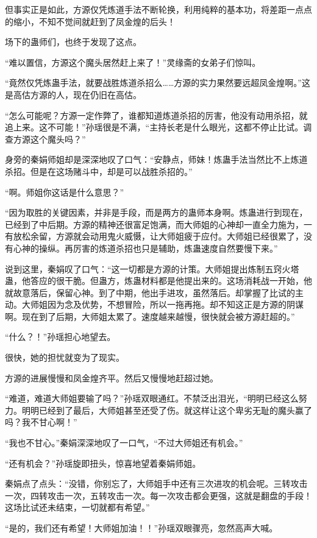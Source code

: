 \begin{this_body}
但事实正是如此，方源仅凭炼道手法不断轮换，利用纯粹的基本功，将差距一点点的缩小，不知不觉间就赶到了凤金煌的后头！

场下的蛊师们，也终于发现了这点。

“难以置信，方源这个魔头居然赶上来了！”灵缘斋的女弟子们惊叫。

“竟然仅凭炼蛊手法，就要战胜炼道杀招么……方源的实力果然要远超凤金煌啊。”这是高估方源的人，现在仍旧在高估。

“怎么可能呢？方源一定作弊了，谁都知道炼道杀招的厉害，他没有动用杀招，就追上来。这不可能！”孙瑶很是不满，“主持长老是什么眼光，这都不停止比试。调查方源这个魔头吗？”

身旁的秦娟师姐却是深深地叹了口气：“安静点，师妹！炼蛊手法当然比不上炼道杀招。但是在这场赌斗中，却是可以战胜杀招的。”

“啊。师姐你这话是什么意思？”

“因为取胜的关键因素，并非是手段，而是两方的蛊师本身啊。炼蛊进行到现在，已经到了中后期。方源的精神还很富足饱满，而大师姐的心神却一直全力施为，一有放松余留，方源就会动用鬼火威慑，让大师姐疲于应付。大师姐已经很累了，没有心神的操纵。再厉害的炼道杀招也只是辅助，炼蛊速度自然要慢下来。”

说到这里，秦娟叹了口气：“这一切都是方源的计策。大师姐提出炼制五窍火塔蛊，他答应的很干脆。但蛊方，炼蛊材料都是他提出来的。这场消耗战一开始，他就故意落后，保留心神。到了中期，他出手进攻，虽然落后。却掌握了比试的主动。大师姐因为念及优势，不想冒险，所以一拖再拖。却不知这正是方源的阴谋啊。现在到了后期，大师姐太累了。速度越来越慢，很快就会被方源赶超的。”

“什么？！”孙瑶担心地望去。

很快，她的担忧就变为了现实。

方源的进展慢慢和凤金煌齐平。然后又慢慢地赶超过她。

“难道，难道大师姐要输了吗？”孙瑶双眼通红。不禁泛出泪光，“明明已经这么努力。明明已经到了最后，大师姐甚至还受了伤。就这样让这个卑劣无耻的魔头赢了吗？我不甘心啊！”

“我也不甘心。”秦娟深深地叹了一口气，“不过大师姐还有机会。”

“还有机会？”孙瑶旋即扭头，惊喜地望着秦娟师姐。

秦娟点了点头：“没错，你别忘了，大师姐手中还有三次进攻的机会呢。三转攻击一次，四转攻击一次，五转攻击一次。每一次攻击都会更强，这就是翻盘的手段！这场比试还未结束，一切就都有希望。”

“是的，我们还有希望！大师姐加油！！”孙瑶双眼骤亮，忽然高声大喊。


\end{this_body}
